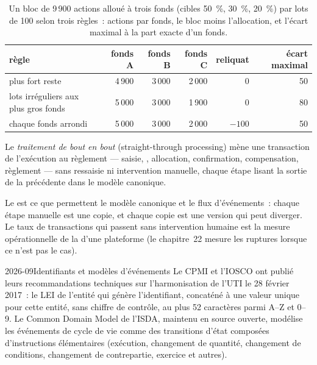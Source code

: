 \begin{table}[ht]
\centering\small
\begin{tabular}{lrrrrr}
\toprule
règle & fonds A & fonds B & fonds C & reliquat & écart maximal \\
\midrule
plus fort reste & 4\,900 & 3\,000 & 2\,000 & 0 & 50 \\
lots irréguliers aux plus gros fonds & 5\,000 & 3\,000 & 1\,900 & 0 & 80 \\
chaque fonds arrondi & 5\,000 & 3\,000 & 2\,000 & $-100$ & 50 \\
\bottomrule
\end{tabular}
\caption{Un bloc de 9\,900 actions alloué à trois fonds (cibles 50~\%, 30~\%, 20~\%) par lots de 100 selon trois règles~: actions par fonds, le
bloc moins l'allocation, et l'écart maximal à la part exacte d'un fonds.}\label{tab:pl:trade-capture-and-booking:allocation}
\end{table}

\begin{definition}\label{def:pl:trade-capture-and-booking:stp}
Le \emph{traitement de bout en bout} (straight-through processing) mène une transaction de l'exécution au règlement --- saisie, ,
allocation, confirmation, compensation, règlement --- sans ressaisie ni intervention manuelle, chaque étape lisant la sortie de la précédente dans le
modèle canonique.
\end{definition}

Le  est ce que permettent le modèle canonique et le flux d'événements~: chaque étape manuelle est une copie, et chaque copie est une version qui peut
diverger. Le taux de transactions qui passent sans intervention humaine est la mesure opérationnelle de la  d'une plateforme (le chapitre~22 mesure
les ruptures lorsque ce n'est pas le cas).

\begin{dated}{2026-09}{Identifiants et modèles d'événements}\label{dat:pl:trade-capture-and-booking:standards}
Le CPMI et l'IOSCO ont publié leurs recommandations techniques sur l'harmonisation de l'UTI le 28 février 2017~: le LEI de l'entité qui génère l'identifiant, concaténé
à une valeur unique pour cette entité, sans chiffre de contrôle, au plus 52 caractères parmi A--Z et 0--9. Le Common Domain Model de l'ISDA, maintenu en source ouverte,
modélise les événements de cycle de vie comme des transitions d'état composées d'instructions élémentaires (exécution, changement de quantité, changement de conditions, changement de contrepartie,
exercice et autres).
\end{dated}

